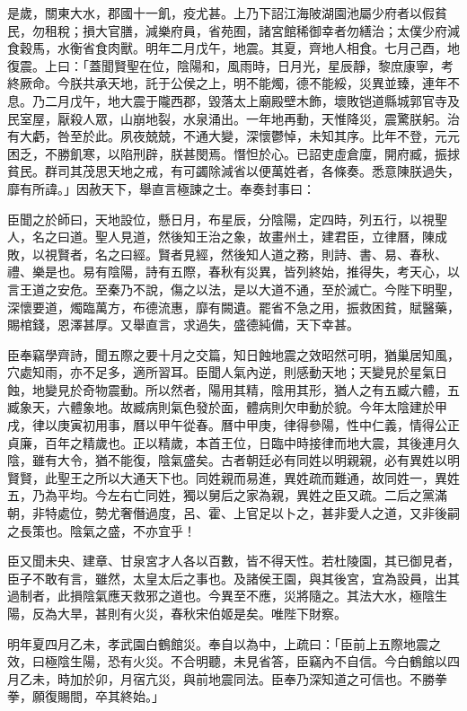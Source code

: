 \begin{pinyinscope}
是歲，關東大水，郡國十一飢，疫尤甚。上乃下詔江海陂湖園池屬少府者以假貧民，勿租稅；損大官膳，減樂府員，省苑囿，諸宮館稀御幸者勿繕治；太僕少府減食穀馬，水衡省食肉獸。明年二月戊午，地震。其夏，齊地人相食。七月己酉，地復震。上曰：「蓋聞賢聖在位，陰陽和，風雨時，日月光，星辰靜，黎庶康寧，考終厥命。今朕共承天地，託于公侯之上，明不能燭，德不能綏，災異並臻，連年不息。乃二月戊午，地大震于隴西郡，毀落太上廟殿壁木飾，壞敗铠道縣城郭官寺及民室屋，厭殺人眾，山崩地裂，水泉涌出。一年地再動，天惟降災，震驚朕躬。治有大虧，咎至於此。夙夜兢兢，不通大變，深懷鬱悼，未知其序。比年不登，元元困乏，不勝飢寒，以陷刑辟，朕甚閔焉。憯怛於心。已詔吏虛倉廩，開府臧，振捄貧民。群司其茂思天地之戒，有可蠲除減省以便萬姓者，各條奏。悉意陳朕過失，靡有所諱。」因赦天下，舉直言極諫之士。奉奏封事曰：

臣聞之於師曰，天地設位，懸日月，布星辰，分陰陽，定四時，列五行，以視聖人，名之曰道。聖人見道，然後知王治之象，故畫州土，建君臣，立律曆，陳成敗，以視賢者，名之曰經。賢者見經，然後知人道之務，則詩、書、易、春秋、禮、樂是也。易有陰陽，詩有五際，春秋有災異，皆列終始，推得失，考天心，以言王道之安危。至秦乃不說，傷之以法，是以大道不通，至於滅亡。今陛下明聖，深懷要道，燭臨萬方，布德流惠，靡有闕遺。罷省不急之用，振救困貧，賦醫藥，賜棺錢，恩澤甚厚。又舉直言，求過失，盛德純備，天下幸甚。

臣奉竊學齊詩，聞五際之要十月之交篇，知日蝕地震之效昭然可明，猶巢居知風，穴處知雨，亦不足多，適所習耳。臣聞人氣內逆，則感動天地；天變見於星氣日蝕，地變見於奇物震動。所以然者，陽用其精，陰用其形，猶人之有五臧六體，五臧象天，六體象地。故臧病則氣色發於面，體病則欠申動於貌。今年太陰建於甲戌，律以庚寅初用事，曆以甲午從春。曆中甲庚，律得參陽，性中仁義，情得公正貞廉，百年之精歲也。正以精歲，本首王位，日臨中時接律而地大震，其後連月久陰，雖有大令，猶不能復，陰氣盛矣。古者朝廷必有同姓以明親親，必有異姓以明賢賢，此聖王之所以大通天下也。同姓親而易進，異姓疏而難通，故同姓一，異姓五，乃為平均。今左右亡同姓，獨以舅后之家為親，異姓之臣又疏。二后之黨滿朝，非特處位，勢尤奢僭過度，呂、霍、上官足以卜之，甚非愛人之道，又非後嗣之長策也。陰氣之盛，不亦宜乎！

臣又聞未央、建章、甘泉宮才人各以百數，皆不得天性。若杜陵園，其已御見者，臣子不敢有言，雖然，太皇太后之事也。及諸侯王園，與其後宮，宜為設員，出其過制者，此損陰氣應天救邪之道也。今異至不應，災將隨之。其法大水，極陰生陽，反為大旱，甚則有火災，春秋宋伯姬是矣。唯陛下財察。

明年夏四月乙未，孝武園白鶴館災。奉自以為中，上疏曰：「臣前上五際地震之效，曰極陰生陽，恐有火災。不合明聽，未見省答，臣竊內不自信。今白鶴館以四月乙未，時加於卯，月宿亢災，與前地震同法。臣奉乃深知道之可信也。不勝拳拳，願復賜間，卒其終始。」


\end{pinyinscope}
